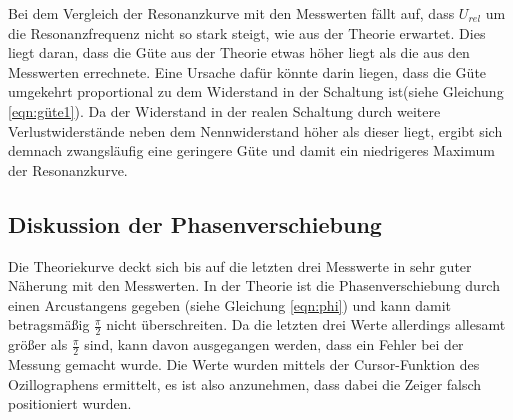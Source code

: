 Bei dem Vergleich der Resonanzkurve mit den Messwerten fällt auf, dass $U_{rel}$
um die Resonanzfrequenz nicht so stark steigt, wie aus der Theorie erwartet.
Dies liegt daran, dass die Güte aus der Theorie etwas höher liegt als die
aus den Messwerten errechnete. Eine Ursache dafür könnte darin liegen, dass
die Güte umgekehrt proportional zu dem Widerstand in der Schaltung ist(siehe
Gleichung \ref{eqn:güte1}).
Da der Widerstand in der realen Schaltung durch weitere Verlustwiderstände neben
dem Nennwiderstand höher als dieser liegt, ergibt sich demnach zwangsläufig
eine geringere Güte und damit ein niedrigeres Maximum der Resonanzkurve.


\subsection{Diskussion der Phasenverschiebung}
Die Theoriekurve deckt sich bis auf die letzten drei Messwerte in sehr guter
Näherung mit den Messwerten. In der Theorie ist die Phasenverschiebung
durch einen Arcustangens gegeben (siehe Gleichung \ref{eqn:phi}) und
kann damit betragsmäßig $\frac{\pi}{2}$ nicht überschreiten.
Da die letzten drei Werte allerdings allesamt größer als $\frac{\pi}{2}$ sind,
kann davon ausgegangen werden, dass ein Fehler bei der Messung gemacht wurde.
Die Werte wurden mittels der Cursor-Funktion des Ozillographens ermittelt, es
ist also anzunehmen, dass dabei die Zeiger falsch positioniert wurden.
